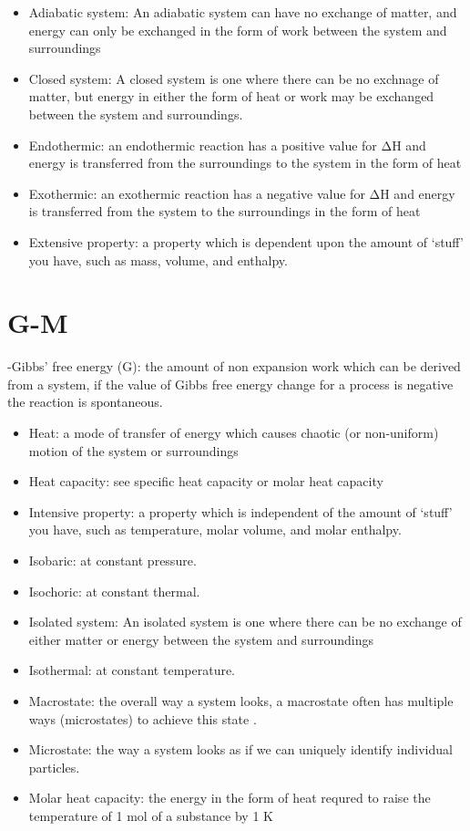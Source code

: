 \documentclass[
]{book}
\begin{document}
\begin{itemize}
\item
  Adiabatic system: An adiabatic system can have no exchange of matter, and energy can only be exchanged in the form of work between the system and surroundings
\item
  Closed system: A closed system is one where there can be no exchnage of matter, but energy in either the form of heat or work may be exchanged between the system and surroundings.
\item
  Endothermic: an endothermic reaction has a positive value for ΔH and energy is transferred from the surroundings to the system in the form of heat
\item
  Exothermic: an exothermic reaction has a negative value for ΔH and energy is transferred from the system to the surroundings in the form of heat
\item
  Extensive property: a property which is dependent upon the amount of `stuff' you have, such as mass, volume, and enthalpy.
\end{itemize}

\hypertarget{g-m}{%
\section*{G-M}\label{g-m}}

-Gibbs' free energy (G): the amount of non expansion work which can be derived from a system, if the value of Gibbs free energy change for a process is negative the reaction is spontaneous.

\begin{itemize}
\item
  Heat: a mode of transfer of energy which causes chaotic (or non-uniform) motion of the system or surroundings
\item
  Heat capacity: see specific heat capacity or molar heat capacity
\item
  Intensive property: a property which is independent of the amount of `stuff' you have, such as temperature, molar volume, and molar enthalpy.
\item
  Isobaric: at constant pressure.
\item
  Isochoric: at constant thermal.
\item
  Isolated system: An isolated system is one where there can be no exchange of either matter or energy between the system and surroundings
\item
  Isothermal: at constant temperature.
\item
  Macrostate: the overall way a system looks, a macrostate often has multiple ways (microstates) to achieve this state .
\item
  Microstate: the way a system looks as if we can uniquely identify individual particles.
\item
  Molar heat capacity: the energy in the form of heat requred to raise the temperature of 1 mol of a substance by 1 K
\end{itemize}
\end{document}
